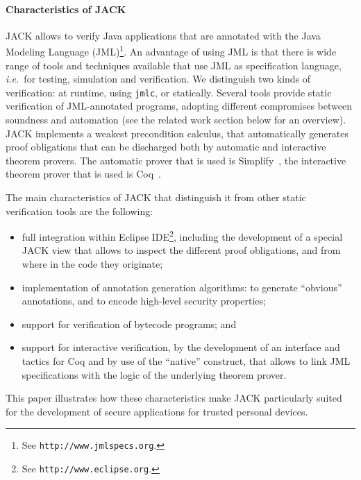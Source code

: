 \paragraph{Characteristics of JACK}
JACK allows to verify Java applications that are annotated with the
Java Modeling Language (JML)\footnote{See
\texttt{http://www.jmlspecs.org}.}. An advantage of using JML is that
there is wide range of tools and techniques available that use JML as
specification language, 
\emph{i.e.}\ for testing, simulation and verification. We
distinguish two kinds of verification: at runtime, using
\texttt{jmlc}, or statically. Several tools provide
static verification of JML-annotated programs, adopting different
compromises between soundness and automation (see the related work
section below for an overview).  JACK implements a weakest
precondition calculus, that automatically generates proof obligations
that can be discharged both by automatic and interactive theorem
provers. The automatic prover that is used is
Simplify~\cite{Simplify}, the interactive theorem prover that is used
is Coq~\cite{Coq}.


The main characteristics of JACK that distinguish it from other static
verification tools are the following:
\begin{itemize}
\item full integration within Eclipse IDE\footnote{See
\texttt{http://www.eclipse.org}.}, including the development of a
special JACK view that allows to inspect the different proof
obligations, and from where in the code they originate;
\item implementation of annotation generation algorithms: to
generate ``obvious'' annotations, and to encode high-level security
properties;
\item support for verification of bytecode programs; and
\item support for interactive verification, by the development of an interface
and tactics for Coq and by use of the ``native'' construct, that allows to
link JML specifications with the logic of the underlying theorem
prover. 
\end{itemize}
This paper illustrates how these characteristics make JACK
particularly suited for the development of secure applications for
trusted personal devices.

